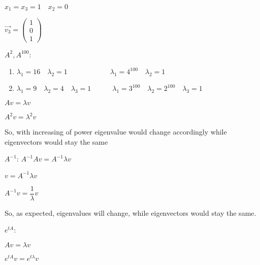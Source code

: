 \documentclass[12pt,letterpaper]{article}
\begin{document}
\begin{enumerate}[label=(\alph*)]
        $x_1 = x_3 = 1\quad x_2=0$
        
        $\vec{v_3} = \begin{pmatrix}
            1\\
            0\\
            1
        \end{pmatrix}$
        
        $A^2, A^{100}$:
        \begin{enumerate}
            \item
                $\lambda_1 = 16 \quad \lambda_2 = 1 \quad\quad\quad\quad\quad\quad \lambda_1 = 4^{100} \quad \lambda_2 = 1$
            \item
                $\lambda_1 = 9 \quad \lambda_2 = 4 \quad \lambda_3 = 1 \quad\quad\quad \lambda_1 = 3^{100} \quad \lambda_2 = 2^{100} \quad \lambda_3 = 1$
        \end{enumerate}
        $Av = \lambda v$
        
        $A^2v = \lambda^2v$
        
        So, with increasing of power eigenvalue would change accordingly while eigenvectors would stay the same
        
        $A^{-1}$:
        $A^{-1}Av = A^{-1}\lambda v$
        
        $v = A^{-1}\lambda v$
        
        $A^{-1}v = \dfrac{1}{\lambda} v$
        
        So, as expected, eigenvalues will change, while eigenvectors would stay the same.
        
        $e^{tA}$:
        
        $Av = \lambda v$
        
        $e^{tA}v = e^{t\lambda}v$
    \end{enumerate}
    
\end{document}
